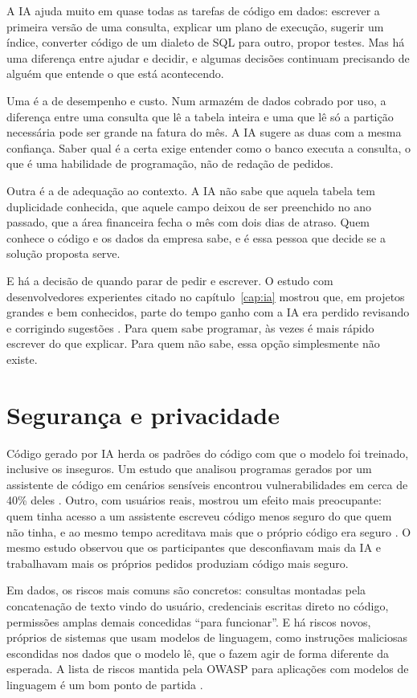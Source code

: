 A IA ajuda muito em quase todas as tarefas de código em dados: escrever a primeira versão
de uma consulta, explicar um plano de execução, sugerir um índice, converter código de um
dialeto de SQL para outro, propor testes. Mas há uma diferença entre ajudar e decidir, e
algumas decisões continuam precisando de alguém que entende o que está acontecendo.

Uma é a de desempenho e custo. Num armazém de dados cobrado por uso, a diferença entre uma
consulta que lê a tabela inteira e uma que lê só a partição necessária pode ser grande na
fatura do mês. A IA sugere as duas com a mesma confiança. Saber qual é a certa exige
entender como o banco executa a consulta, o que é uma habilidade de programação, não de
redação de pedidos.

Outra é a de adequação ao contexto. A IA não sabe que aquela tabela tem duplicidade
conhecida, que aquele campo deixou de ser preenchido no ano passado, que a área financeira
fecha o mês com dois dias de atraso. Quem conhece o código e os dados da empresa sabe, e é
essa pessoa que decide se a solução proposta serve.

E há a decisão de quando parar de pedir e escrever. O estudo com desenvolvedores
experientes citado no capítulo~\ref{cap:ia} mostrou que, em projetos grandes e bem
conhecidos, parte do tempo ganho com a IA era perdido revisando e corrigindo sugestões
\parencite{becker2025}. Para quem sabe programar, às vezes é mais rápido escrever do que
explicar. Para quem não sabe, essa opção simplesmente não existe.

\section{Segurança e privacidade}
\label{sec:seguranca}

Código gerado por IA herda os padrões do código com que o modelo foi treinado, inclusive os
inseguros. Um estudo que analisou programas gerados por um assistente de código em cenários
sensíveis encontrou vulnerabilidades em cerca de 40\% deles \parencite{pearce2022}. Outro,
com usuários reais, mostrou um efeito mais preocupante: quem tinha acesso a um assistente
escreveu código menos seguro do que quem não tinha, e ao mesmo tempo acreditava mais que o
próprio código era seguro \parencite{perry2023}. O mesmo estudo observou que os
participantes que desconfiavam mais da IA e trabalhavam mais os próprios pedidos produziam
código mais seguro.

Em dados, os riscos mais comuns são concretos: consultas montadas pela concatenação de
texto vindo do usuário, credenciais escritas direto no código, permissões amplas demais
concedidas \enquote{para funcionar}. E há riscos novos, próprios de sistemas que usam
modelos de linguagem, como instruções maliciosas escondidas nos dados que o modelo lê, que
o fazem agir de forma diferente da esperada. A lista de riscos mantida pela OWASP para
aplicações com modelos de linguagem é um bom ponto de partida \parencite{owasp2025}.

